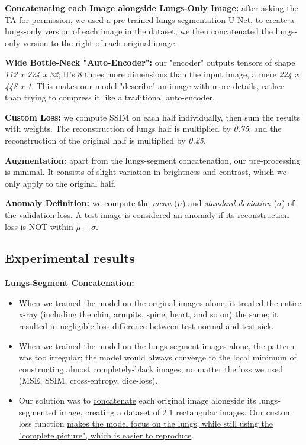 \documentclass{article}
\begin{document}
\textbf{Concatenating each Image alongside Lungs-Only Image:} after asking the TA for permission, we used a \href{https://www.kaggle.com/datasets/farhanhaikhan/unet-lung-segmentation-weights-for-chest-x-rays/data}{pre-trained lungs-segmentation U-Net}, to create a lungs-only version of each image in the dataset; we then concatenated the lungs-only version to the right of each original image.

\textbf{Wide Bottle-Neck "Auto-Encoder":} our "encoder" outputs tensors of shape \textit{112 x 224 x 32}; It's 8 times more dimensions than the input image, a mere \textit{224 x 448 x 1}. This makes our model "describe" an image with more details, rather than trying to compress it like a traditional auto-encoder.

\textbf{Custom Loss:} we compute SSIM on each half individually, then sum the results with weights. The reconstruction of lungs half is multiplied by \textit{0.75}, and the reconstruction of the original half is multiplied by \textit{0.25}.

\textbf{Augmentation:} apart from the lungs-segment concatenation, our pre-processing is minimal. It consists of slight variation in brightness and contrast, which we only apply to the original half.

\textbf{Anomaly Definition:} we compute the \textit{mean} ($\mu$) and \textit{standard deviation} ($\sigma$) of the validation loss. A test image is considered an anomaly if its reconstruction loss is NOT within $\mu\pm\sigma$.

\newpage
\subsection{Experimental results}

\textbf{Lungs-Segment Concatenation:} 
\begin{itemize}
\item When we trained the model on the \uline{original images alone}, it treated the entire x-ray (including the chin, armpits, spine, heart, and so on) the same; it resulted in \uline{negligible loss difference} between test-normal and test-sick.
\item When we trained the model on the \uline{lungs-segment images alone}, the pattern was too irregular; the model would always converge to the local minimum of constructing \uline{almost completely-black images}, no matter the loss we used (MSE, SSIM, cross-entropy, dice-loss).
\item Our solution was to \uline{concatenate} each original image alongside its lungs-segmented image, creating a dataset of 2:1 rectangular images. Our custom loss function \uline{makes the model focus on the lungs, while still using the "complete picture", which is easier to reproduce}.
\end{itemize}
\end{document}

